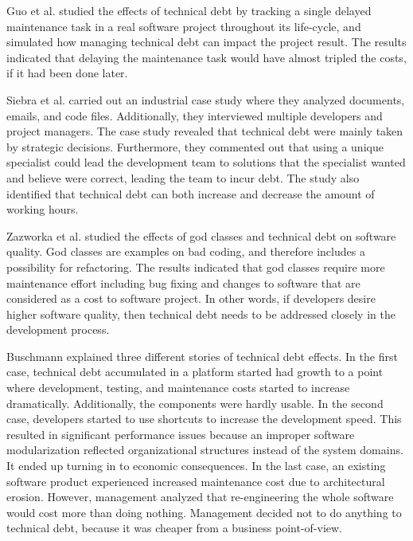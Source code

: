 {Guo et al.\cite{guo2011tracking} studied the effects of technical debt by tracking a single delayed maintenance task in a real software project throughout its life-cycle, and simulated how managing technical debt can impact the project result. The results indicated that delaying the maintenance task would have almost tripled the costs, if it had been done later.

Siebra et al.\cite{p247-siebra} carried out an industrial case study where they analyzed documents, emails, and code files. Additionally, they interviewed multiple developers and project managers. The case study revealed that technical debt were mainly taken by strategic decisions. Furthermore, they commented out that using a unique specialist could lead the development team to solutions that the specialist wanted and believe were correct, leading the team to incur debt. The study also identified that technical debt can both increase and decrease the amount of working hours.

Zazworka et al.\cite{zazworka2011investigating} studied the effects of god classes and technical debt on software quality. God classes are examples on bad coding, and therefore includes a possibility for refactoring\cite{Zazworka:2011:PDD:1985362.1985372}. The results indicated that god classes require more maintenance effort including bug fixing and changes to software that are considered as a cost to software project. In other words, if developers desire higher software quality, then technical debt needs to be addressed closely in the development process.

Buschmann\cite{buschmann2011pay} explained three different stories of technical debt effects. In the first case, technical debt accumulated in a platform started had growth to a point where development, testing, and maintenance costs started to increase dramatically. Additionally, the components were hardly usable. In the second case, developers started to use shortcuts to increase the development speed. This resulted in significant performance issues because an improper software modularization reflected organizational structures instead of the system domains. It ended up turning in to economic consequences. In the last case, an existing software product experienced increased maintenance cost due to architectural erosion. However, management analyzed that re-engineering the whole software would cost more than doing nothing. Management decided not to do anything to technical debt, because it was cheaper from a business point-of-view.

}
